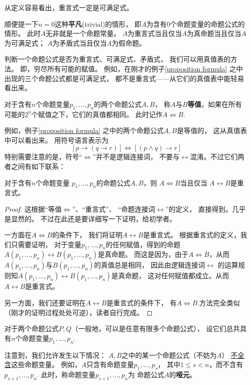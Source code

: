 从定义容易看出，重言式一定是可满足式。

顺便提一下$n=0$这种\textbf{平凡}(trivial)的情形，
即$A$为含有0个命题变量的命题公式的情形。
此时$A$无非就是一个命题常量。
$A$为重言式当且仅当$A$为真命题当且仅当$A$为可满足式；
$A$为矛盾式当且仅当$A$为假命题。\vs

判断一个命题公式是否为重言式、可满足式、矛盾式，
我们可以用真值表的方法。
即，穷尽所有可能的赋值。
例如，在刚才的例子\ref{proposition formula}
之中出现的三个命题公式都是可满足式，
都不是重言式——从它们的真值表中能轻易看出来。

\begin{definition}[命题公式的等值]
对于含有$n$个命题变量$p_1,...,p_n$的两个命题公式$A,B$，
称$A$与$B$\textbf{等值}，如果在所有可能的$2^n$个赋值之下，它们的真值都相同。
此时记作$A\Leftrightarrow B$.
\end{definition}
例如，例子\ref{proposition formula}
之中的两个命题公式$A,B$是等值的，
这从真值表中可以看出来。
用符号语言表示为
$$[p\rightarrow (q\rightarrow r)]
\Leftrightarrow [(p\wedge q)\rightarrow r]$$
特别需要注意的是，符号“$\Leftrightarrow$”并不是逻辑连接词，
不要与$\leftrightarrow$混淆。不过它们两者之间有如下联系：

\begin{thm}对于含有$n$个命题变量
$p_1,...,p_n$的命题公式$A,B$，则
$A\Leftrightarrow B$当且仅当
$A\leftrightarrow B$是重言式。
\end{thm}
\begin{proof}
这根据“等值$\Leftrightarrow$”、“重言式”、
“命题连接词$\leftrightarrow$”的定义，
直接得到。几乎是显然的。
不过在此还是要详细写一下证明，给初学者。

一方面在$A\Leftrightarrow B$的条件下，
我们将证明$A\leftrightarrow B$是重言式。
根据重言式的定义，我们只需要证明，
对于变量$p_1,...,p_n$的任何赋值，得到的命题
$A(p_1,...,p_n)\leftrightarrow B(p_1,...,p_n)$是真命题。
而这是因为，由于$A\Leftrightarrow B$，从而
$A(p_1,...,p_n)$与$B(p_1,...,p_n)$的真值总是相同，
因此由逻辑连接词$\leftrightarrow$
的运算规则知$A(p_1,...,p_n)
\leftrightarrow B(p_1,...,p_n)$是真命题，
这对任何赋值都成立。从而$A\leftrightarrow B$是重言式。

另一方面，我们还要证明在$A\leftrightarrow B$是重言式的条件下，
有$A\Leftrightarrow B$.方法完全类似
（刚才的证明过程处处可逆），读者自行完成。
\end{proof}

\begin{rem}[关于命题公式的命题变量个数]
对于两个命题公式$P,Q$（一般地，可以是任意有限多个命题公式），
设它们总共具有$n$个命题变量$p_1,...,p_n$.

注意到，我们允许发生以下情况：
$A,B$之中的某一个命题公式（不妨为$A$）
\underline{不全含}这些命题变量。
例如，$A$只含有命题变量$p_1,...,p_s$，
其中$1\leq s<n$，而不含有$p_{s+1},...,p_{n}$.
此时，称命题变量$p_{s+1},...,p_{n}$为
命题公式$A$的\textbf{哑元}。
\end{rem}

